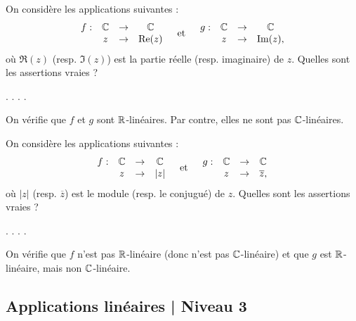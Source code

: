 \begin{question}
On considère les applications suivantes : 
$$\begin{array}{rccc}f:&\mathbb{C}&\to&\mathbb{C}\\
& z&\to& \mathop{\mathrm{Re}}\nolimits (z)\end{array}   \quad \mbox{et} \quad  \begin{array}{rccc}g:&\mathbb{C}&\to&\mathbb{C}\\
& z&\to& \mathop{\mathrm{Im}}\nolimits (z), \end{array}$$
où $\Re (z)$ (resp. $\Im (z)$) est la partie réelle (resp. imaginaire) de $z$. Quelles sont les assertions vraies ?
\begin{answers}  
.
.
.
.
\end{answers}
\begin{explanations} On vérifie que $f$ et $g$ sont $\mathbb{R}$-linéaires. Par contre, elles ne sont pas $\mathbb{C}$-linéaires.
\end{explanations}
\end{question}


\begin{question}
On considère les applications suivantes : 
$$\begin{array}{rccc}f:&\mathbb{C}&\to&\mathbb{C}\\
& z&\to& |z|\end{array}  \quad \mbox{et} \quad \begin{array}{rccc}g:&\mathbb{C}&\to&\mathbb{C}\\
& z&\to& \overline{z},
\end{array} $$
où $|z|$ (resp. $\overline{z}$) est le module (resp. le conjugué) de $z$. Quelles sont les assertions vraies ?
\begin{answers}  
.
.
.
.
\end{answers}
\begin{explanations} On vérifie que $f$ n'est pas $\mathbb{R}$-linéaire (donc n'est pas $\mathbb{C}$-linéaire) et que $g$ est $\mathbb{R}$-linéaire, mais non $\mathbb{C}$-linéaire.
\end{explanations}
\end{question}



\subsection{Applications linéaires | Niveau 3}


